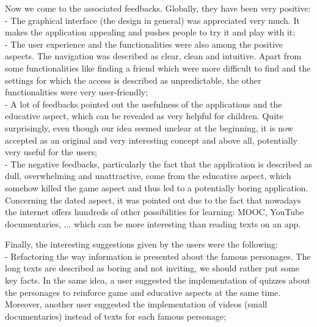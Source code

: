 \documentclass[12pt]{scrartcl}
\begin{document}
	\newpage

	Now we come to the associated feedbacks. Globally, they have been very positive:\\

		- The graphical interface (the design in general) was appreciated very much. It makes the application appealing and pushes people to try it and play with it;\\

		- The user experience and the functionalities were also among the positive aspects. The navigation was described as clear, clean and intuitive. Apart from some functionalities like finding a friend which were more difficult to find and the settings for which the access is described as unpredictable, the other functionalities were very user-friendly;\\

		- A lot of feedbacks pointed out the usefulness of the applications and the educative aspect, which can be revealed as very helpful for children. Quite surprisingly, even though our idea seemed unclear at the beginning, it is now accepted as an original and very interesting concept and above all, potentially very useful for the users;\\

		- The negative feedbacks, particularly the fact that the application is described as dull, overwhelming and unattractive, come from the educative aspect, which somehow killed the game aspect and thus led to a potentially boring application. Concerning the dated aspect, it was pointed out due to the fact that nowadays the internet offers hundreds of other possibilities for learning: MOOC, YouTube documentaries, ... which can be more interesting than reading texts on an app.\\
		\newline

	Finally, the interesting suggestions given by the users were the following:\\

		- Refactoring the way information is presented about the famous personages. The long texts are described as boring and not inviting, we should rather put some key facts. In the same idea, a user suggested the implementation of quizzes about the personages to reinforce game and educative aspects at the same time. Moreover, another user suggested the implementation of videos (small documentaries) instead of texts for each famous personage;\\
\end{document}
